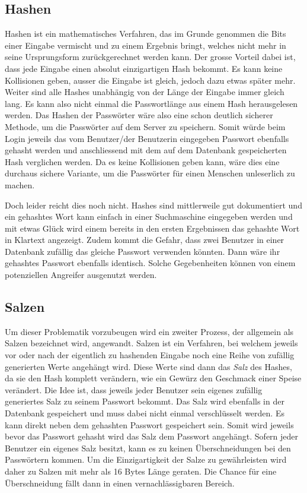 \documentclass[../main.tex]{subfiles}
\begin{document}
	\subsection{Hashen}
	Hashen ist ein mathematisches Verfahren, das im Grunde genommen die Bits einer Eingabe vermischt und zu einem Ergebnis bringt, welches nicht mehr in seine Ursprungsform zurückgerechnet werden kann. Der grosse Vorteil dabei ist, dass jede Eingabe einen absolut einzigartigen Hash bekommt. Es kann keine Kollisionen geben, ausser die Eingabe ist gleich, jedoch dazu etwas später mehr. Weiter sind alle Hashes unabhängig von der Länge der Eingabe immer gleich lang. Es kann also nicht einmal die Passwortlänge aus einem Hash herausgelesen werden. Das Hashen der Passwörter wäre also eine schon deutlich sicherer Methode, um die Passwörter auf dem Server zu speichern. Somit würde beim Login jeweils das vom Benutzer/der Benutzerin eingegeben Passwort ebenfalls gehasht werden und anschliessend mit dem auf dem Datenbank gespeicherten Hash verglichen werden. Da es keine Kollisionen geben kann, wäre dies eine durchaus sichere Variante, um die Passwörter für einen Menschen unleserlich zu machen. 
	
	Doch leider reicht dies noch nicht. Hashes sind mittlerweile gut dokumentiert und ein gehashtes Wort kann einfach in einer Suchmaschine eingegeben werden und mit etwas Glück wird einem bereits in den ersten Ergebnissen das gehashte Wort in Klartext angezeigt. Zudem kommt die Gefahr, dass zwei Benutzer in einer Datenbank zufällig das gleiche Passwort verwenden könnten. Dann wäre ihr gehashtes Passwort ebenfalls identisch. Solche Gegebenheiten können von einem potenziellen Angreifer ausgenutzt werden. \cite{defuse} \cite{security}
	
	\subsection{Salzen}
	Um dieser Problematik vorzubeugen wird ein zweiter Prozess, der allgemein als Salzen bezeichnet wird, angewandt. Salzen ist ein Verfahren, bei welchem jeweils vor oder nach der eigentlich zu hashenden Eingabe noch eine Reihe von zufällig generierten Werte angehängt wird. Diese Werte sind dann das \emph{Salz} des Hashes, da sie den Hash komplett verändern, wie ein Gewürz den Geschmack einer Speise verändert. Die Idee ist, dass jeweils jeder Benutzer sein eigenes zufällig generiertes Salz zu seinem Passwort bekommt. Das Salz wird ebenfalls in der Datenbank gespeichert und muss dabei nicht einmal verschlüsselt werden. Es kann direkt neben dem gehashten Passwort gespeichert sein. Somit wird jeweils bevor das Passwort gehasht wird das Salz dem Passwort angehängt. Sofern jeder Benutzer ein eigenes Salz besitzt, kann es zu keinen Überschneidungen bei den Passwörtern kommen. Um die Einzigartigkeit der Salze zu gewährleisten wird daher zu Salzen mit mehr als 16 Bytes Länge geraten. Die Chance für eine Überschneidung fällt dann in einen vernachlässigbaren Bereich. 
	
\end{document}

